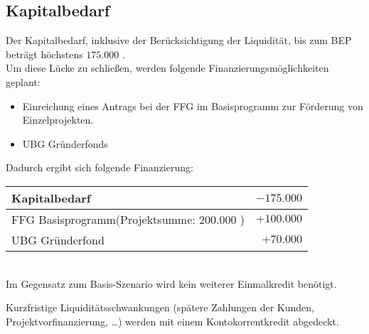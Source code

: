 \subsection{Kapitalbedarf}
Der Kapitalbedarf, inklusive der Berücksichtigung der Liquidität, bis zum BEP beträgt höchstens $175.000$ \officialeuro.\\
Um diese Lücke zu schließen, werden folgende Finanzierungsmöglichkeiten geplant:
\begin{itemize}
	\item Einreichung eines Antrags bei der FFG im Basisprogramm zur Förderung von Einzelprojekten.
	\item UBG Gründerfonds
\end{itemize}
Dadurch ergibt sich folgende Finanzierung:\\
\begin{tabular}{l r}
	Kapitalbedarf & $-175.000$ \officialeuro \\
	\hline
	FFG Basisprogramm(Projektsumme: $200.000$ \officialeuro) & $+100.000$ \officialeuro \\
	UBG Gründerfond & $+70.000$ \officialeuro \\
	\bottomrule
\end{tabular}\\

\noindent Im Gegensatz zum Basis-Szenario wird kein weiterer Einmalkredit benötigt.

\noindent Kurzfristige Liquiditätsschwankungen (spätere Zahlungen der Kunden, Projektvorfinanzierung, …) werden mit einem Kontokorrentkredit abgedeckt.

\newpage
